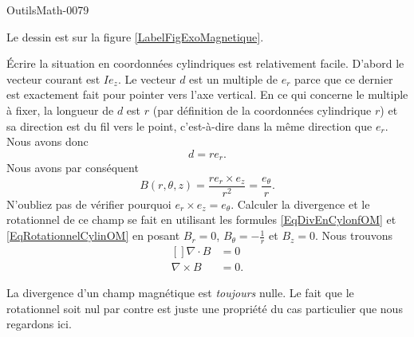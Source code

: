 
\begin{corrige}{OutilsMath-0079}

    Le dessin est sur la figure \ref{LabelFigExoMagnetique}.
    \newcommand{\CaptionFigExoMagnetique}{La façon naturelle de décrire la situation sont les coordonnées cylindriques.}
    

    Écrire la situation en coordonnées cylindriques est relativement facile. D'abord le vecteur courant est $Ie_z$. Le vecteur $d$ est un multiple de $e_r$ parce que ce dernier est exactement fait pour pointer vers l'axe vertical. En ce qui concerne le multiple à fixer, la longueur de $d$ est $r$ (par définition de la coordonnées cylindrique $r$) et sa direction est du fil vers le point, c'est-à-dire dans la même direction que $e_r$. Nous avons donc
    \begin{equation}
        d=re_r.
    \end{equation}
    Nous avons par conséquent
    \begin{equation}
        B(r,\theta,z)=\frac{ re_r\times e_z }{ r^2 }=\frac{ e_{\theta} }{ r }.
    \end{equation}
    N'oubliez pas de vérifier pourquoi $e_r\times e_z=e_{\theta}$. Calculer la divergence et le rotationnel de ce champ se fait en utilisant les formules \eqref{EqDivEnCylonfOM} et \eqref{EqRotationnelCylinOM} en posant $B_r=0$, $B_{\theta}=-\frac{1}{ r }$ et $B_z=0$. Nous trouvons
    \begin{equation}
        \begin{aligned}[]
            \nabla\cdot B&=0\\
            \nabla\times B&=0.
        \end{aligned}
    \end{equation}
    
    \begin{remark}
        La divergence d'un champ magnétique est \emph{toujours} nulle. Le fait que le rotationnel soit nul par contre est juste une propriété du cas particulier que nous regardons ici.
    \end{remark}

\end{corrige}
